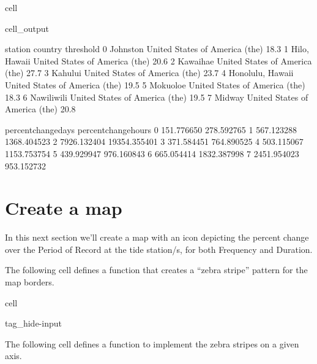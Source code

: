 \documentclass[letterpaper,10pt,english]{jupyterBook}
\begin{document}
\begin{sphinxuseclass}{cell}
\begin{sphinxVerbatimOutput}
\begin{sphinxuseclass}{cell_output}
\begin{sphinxVerbatim}[commandchars=\\\{\}]
            station                         country  threshold  \PYGZbs{}
0          Johnston  United States of America (the)       18.3   
1      Hilo, Hawaii  United States of America (the)       20.6   
2          Kawaihae  United States of America (the)       27.7   
3           Kahului  United States of America (the)       23.7   
4  Honolulu, Hawaii  United States of America (the)       19.5   
5          Mokuoloe  United States of America (the)       18.3   
6        Nawiliwili  United States of America (the)       19.5   
7            Midway  United States of America (the)       20.8   

   percent\PYGZus{}change\PYGZus{}days  percent\PYGZus{}change\PYGZus{}hours  
0           151.776650            278.592765  
1           567.123288           1368.404523  
2          7926.132404          19354.355401  
3           371.584451            764.890525  
4           503.115067           1153.753754  
5           439.929947            976.160843  
6           665.054414           1832.387998  
7          2451.954023            953.152732  
\end{sphinxVerbatim}

\end{sphinxuseclass}\end{sphinxVerbatimOutput}

\end{sphinxuseclass}

\part{Create a map}
\label{\detokenize{notebooks/FloodFrequency:create-a-map}}
\sphinxAtStartPar
In this next section we’ll create a map with an icon depicting the percent change over the Period of Record at the tide station/s, for both Frequency and Duration.

\sphinxAtStartPar
The following cell defines a function that creates a “zebra stripe” pattern for the map borders.

\begin{sphinxuseclass}{cell}
\begin{sphinxuseclass}{tag_hide-input}
\end{sphinxuseclass}
\end{sphinxuseclass}
\sphinxAtStartPar
The following cell defines a function to implement the zebra stripes on a given axis.
\end{document}
